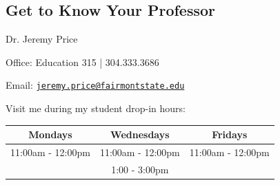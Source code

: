 \documentclass{tufte-handout}
\begin{document}
\vfill

\subsection{Get to Know Your Professor}

\noindent Dr. Jeremy Price

\noindent Office: Education 315 | 304.333.3686

\noindent {}Email: \href{mailto:jeremy.price@fairmontstate.edu}{\nolinkurl{jeremy.price@fairmontstate.edu}}

\noindent Visit me during my student drop-in hours:
\begin{table}[ht]
  \centering
  \begin{tabular}{ccc}
    \toprule
    Mondays & Wednesdays & Fridays \\
    \midrule
    11:00am - 12:00pm & 11:00am - 12:00pm & 11:00am - 12:00pm \\
    & 1:00 - 3:00pm & \\
    \bottomrule
  \end{tabular}
\end{table}
\newpage
\end{document}
